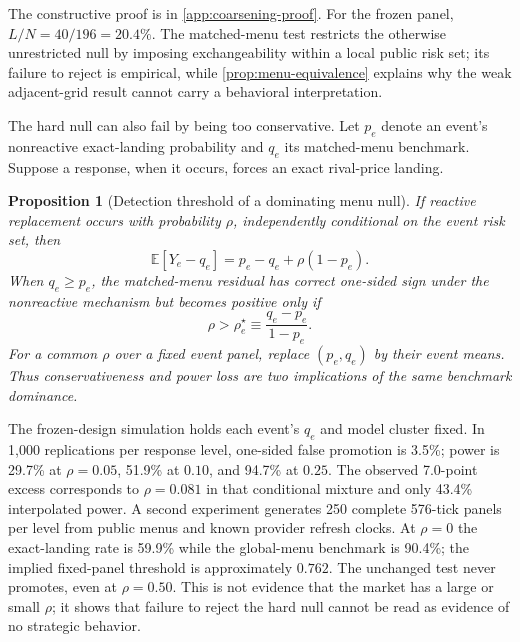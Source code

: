 \documentclass[11pt]{article}
\newcommand{\1}{\mathbf{1}}
\newtheorem{proposition}{Proposition}
\begin{document}
{The constructive proof is in \cref{app:coarsening-proof}.  For the frozen panel,
$L/N=40/196=20.4\%$.  The matched-menu test restricts the otherwise unrestricted
null by imposing exchangeability within a local public risk set; its failure to
reject is empirical, while \cref{prop:menu-equivalence} explains why the weak
adjacent-grid result cannot carry a behavioral interpretation.

The hard null can also fail by being too conservative.  Let $p_e$ denote an
event's nonreactive exact-landing probability and $q_e$ its matched-menu
benchmark.  Suppose a response, when it occurs, forces an exact rival-price
landing.

\begin{proposition}[Detection threshold of a dominating menu null]
\label{prop:menu-detection-threshold}
If reactive replacement occurs with probability $\rho$, independently conditional
on the event risk set, then
\begin{equation}
  \mathbb{E}[Y_e-q_e]=p_e-q_e+\rho(1-p_e).
  \label{eq:menu-detection-threshold}
\end{equation}
When $q_e\geq p_e$, the matched-menu residual has correct one-sided sign under the
nonreactive mechanism but becomes positive only if
\begin{equation}
  \rho>\rho_e^\star\equiv\frac{q_e-p_e}{1-p_e}.
\end{equation}
For a common $\rho$ over a fixed event panel, replace $(p_e,q_e)$ by their event
means.  Thus conservativeness and power loss are two implications of the same
benchmark dominance.
\end{proposition}

The frozen-design simulation holds each event's $q_e$ and model cluster fixed.  In
1,000 replications per response level, one-sided false promotion is 3.5\%; power is
29.7\% at $\rho=0.05$, 51.9\% at $0.10$, and 94.7\% at $0.25$.  The observed
7.0-point excess corresponds to $\rho=0.081$ in that conditional mixture and only
43.4\% interpolated power.  A second experiment generates 250 complete 576-tick
panels per level from public menus and known provider refresh clocks.  At $\rho=0$
the exact-landing rate is 59.9\% while the global-menu benchmark is 90.4\%; the
implied fixed-panel threshold is approximately $0.762$.  The unchanged test never
promotes, even at $\rho=0.50$.  This is not evidence that the market has a large or
small $\rho$; it shows that failure to reject the hard null cannot be read as
evidence of no strategic behavior.

}
\end{document}
